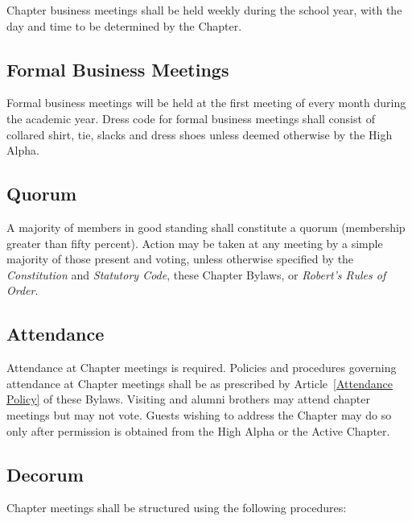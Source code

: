 \documentclass{article}
\begin{document}
Chapter business meetings shall be held weekly during the school year, with the
day and time to be determined by the Chapter.

\subsection{Formal Business Meetings}

Formal business meetings will be held at the first meeting of every month during
the academic year. Dress code for formal business meetings shall consist of
collared shirt, tie, slacks and dress shoes unless deemed otherwise by the High
Alpha.

\subsection{Quorum}

A majority of members in good standing shall constitute a quorum 
(membership greater than fifty percent). Action may be taken at any meeting by a
simple majority of those present and voting, unless otherwise specified by the
\emph{Constitution} and \emph{Statutory Code}, these Chapter Bylaws, or
\emph{Robert’s Rules of Order}.

\subsection{Attendance}

Attendance at Chapter meetings is required. Policies and procedures governing
attendance at Chapter meetings shall be as prescribed by
Article~\ref{Attendance Policy} of these Bylaws. Visiting and alumni brothers
may attend chapter meetings but may not vote. Guests wishing to address the
Chapter may do so only after permission is obtained from the High Alpha or the
Active Chapter.

\subsection{Decorum}

Chapter meetings shall be structured using the following procedures:
\end{document}

